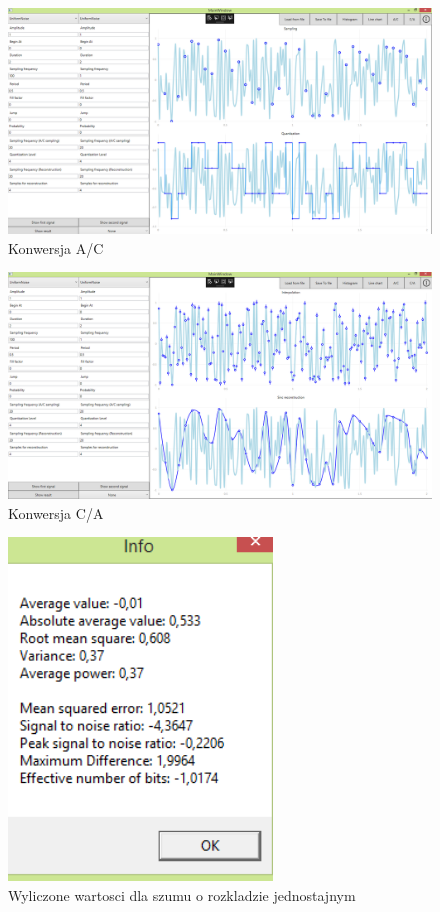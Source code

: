 \documentclass[12pt]{article}
\begin{document}
\begin{figure}[H]
 \centering
 \includegraphics[width=14cm]{images/uniac.PNG}
 \vspace{-0.3cm}
 \caption{Konwersja A/C}
 \label{gui}
\end{figure}

\begin{figure}[H]
 \centering
 \includegraphics[width=14cm]{images/unica.PNG}
 \vspace{-0.3cm}
 \caption{Konwersja C/A}
 \label{gui}
\end{figure}

\begin{figure}[H]
 \centering
 \includegraphics[width=7cm]{images/uniinfo.PNG}
 \vspace{-0.3cm}
 \caption{Wyliczone wartosci dla szumu o rozkladzie jednostajnym}
 \label{gui}
\end{figure}
\end{document}

